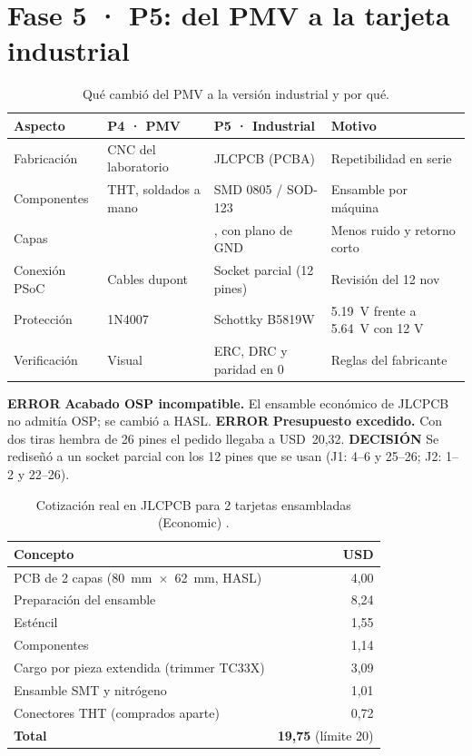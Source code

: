 \documentclass[11pt,a4paper]{article}
\newcommand{\etq}[2]{\colorbox{#1!15}{\textcolor{#1}{\scriptsize\bfseries #2}}}
\newcommand{\terr}{\etq{nok}{ERROR}}
\newcommand{\tdec}{\etq{usco}{DECISIÓN}}
\begin{document}
\section{Fase 5 · P5: del PMV a la tarjeta industrial}\label{sec:f5}
\begin{table}[H]\centering\small
\caption{Qué cambió del PMV a la versión industrial y por qué.}
\begin{tabularx}{\linewidth}{>{\raggedright\arraybackslash}p{3.0cm}>{\raggedright\arraybackslash}p{3.4cm}>{\raggedright\arraybackslash}p{3.6cm}X}
\toprule
Aspecto & P4 · PMV & P5 · Industrial & Motivo \\
\midrule
Fabricación & CNC del laboratorio & JLCPCB (PCBA) & Repetibilidad en serie \\
Componentes & THT, soldados a mano & SMD 0805 / SOD-123 & Ensamble por máquina \\
Capas & 1 & 2, con plano de GND & Menos ruido y retorno corto \\
Conexión PSoC & Cables dupont & Socket parcial (12 pines) & Revisión del 12 nov \\
Protección & 1N4007 & Schottky B5819W & \SI{5.19}{V} frente a \SI{5.64}{V} con 12 V \\
Verificación & Visual & ERC, DRC y paridad en 0 & Reglas del fabricante \\
\bottomrule
\end{tabularx}
\end{table}

\terr{} \textbf{Acabado OSP incompatible.} El ensamble económico de JLCPCB no admitía OSP; se cambió a HASL. \terr{} \textbf{Presupuesto excedido.} Con dos tiras hembra de 26 pines el pedido llegaba a USD~20,32. \tdec{} Se rediseñó a un socket parcial con los 12 pines que se usan (J1: 4--6 y 25--26; J2: 1--2 y 22--26).

\begin{table}[H]\centering\small
\caption{Cotización real en JLCPCB para 2 tarjetas ensambladas (Economic) \cite{jlc}.}
\begin{tabular}{lr}
\toprule
Concepto & USD \\
\midrule
PCB de 2 capas (\SI{80}{mm}~$\times$~\SI{62}{mm}, HASL) & 4,00 \\
Preparación del ensamble & 8,24 \\
Esténcil & 1,55 \\
Componentes & 1,14 \\
Cargo por pieza extendida (trimmer TC33X) & 3,09 \\
Ensamble SMT y nitrógeno & 1,01 \\
Conectores THT (comprados aparte) & 0,72 \\
\midrule
\textbf{Total} & \textbf{19,75} (límite 20) \\
\bottomrule
\end{tabular}
\end{table}
\end{document}
